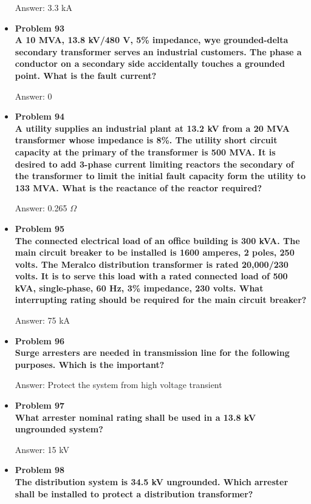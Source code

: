 \documentclass{article}
\begin{document}
\begin{center}
\begin{itemize}
    Answer: 3.3 kA

    \item\textbf{Problem 93\\%
    A 10 MVA, 13.8 kV/480 V, 5\% impedance, wye grounded-delta secondary transformer serves an industrial customers. The phase a conductor on a secondary side accidentally touches a grounded point. What is the fault current?}

    Answer: 0

    \item\textbf{Problem 94\\%
    A utility supplies an industrial plant at 13.2 kV from a 20 MVA transformer whose impedance is 8\%. The utility short circuit capacity at the primary of the transformer is 500 MVA. It is desired to add 3-phase current limiting reactors the secondary of the transformer to limit the initial fault capacity form the utility to 133 MVA. What is the reactance of the reactor required?}

    Answer: 0.265 $\Omega$

    \item\textbf{Problem 95\\%
    The connected electrical load of an office building is 300 kVA. The main circuit breaker to be installed is 1600 amperes, 2 poles, 250 volts. The Meralco distribution transformer is rated 20,000/230 volts. It is to serve this load with a rated connected load of 500 kVA, single-phase, 60 Hz, 3\% impedance, 230 volts. What interrupting rating should be required for the main circuit breaker?}

    Answer: 75 kA

    \item\textbf{Problem 96\\%
    Surge arresters are needed in transmission line for the following purposes. Which is the important?}

    Answer: Protect the system from high voltage transient

    \item\textbf{Problem 97\\%
    What arrester nominal rating shall be used in a 13.8 kV ungrounded system?}

    Answer: 15 kV

    \item\textbf{Problem 98\\%
    The distribution system is 34.5 kV ungrounded. Which arrester shall be installed to protect a distribution transformer?}


\end{itemize}
\end{center}
\end{document}
